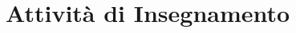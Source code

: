 \documentclass[a4paper,10pt]{article}
\begin{document}
\section*{Attivit\`a di Insegnamento}

\end{document}
